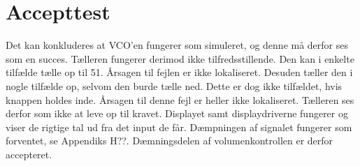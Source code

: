 \section{Accepttest}
\label{volumenkontrol-accepttest}
Det kan konkluderes at VCO'en fungerer som simuleret, og denne må derfor ses som en succes. Tælleren fungerer derimod ikke tilfredsstillende. Den kan i enkelte tilfælde tælle op til 51. Årsagen til fejlen er ikke lokaliseret. Desuden tæller den i nogle tilfælde op, selvom den burde tælle ned. Dette er dog ikke tilfældet, hvis knappen holdes inde. Årsagen til denne fejl er heller ikke lokaliseret. Tælleren ses derfor som ikke at leve op til kravet. Displayet samt displaydriverne fungerer og viser de rigtige tal ud fra det input de får.
Dæmpningen af signalet fungerer som forventet, se Appendiks H??. Dæmningsdelen af volumenkontrollen er derfor accepteret.